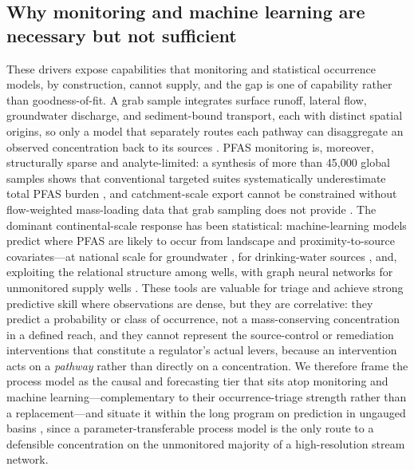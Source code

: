\subsection{Why monitoring and machine learning are necessary but not sufficient}
These drivers expose capabilities that monitoring and statistical occurrence models, by construction, cannot supply, and the gap is one of capability rather than goodness-of-fit. A grab sample integrates surface runoff, lateral flow, groundwater discharge, and sediment-bound transport, each with distinct spatial origins, so only a model that separately routes each pathway can disaggregate an observed concentration back to its sources \citep{rafiei2023}. PFAS monitoring is, moreover, structurally sparse and analyte-limited: a synthesis of more than 45{,}000 global samples shows that conventional targeted suites systematically underestimate total PFAS burden \citep{grunfeld2024}, and catchment-scale export cannot be constrained without flow-weighted mass-loading data that grab sampling does not provide \citep{byrne2024}. The dominant continental-scale response has been statistical: machine-learning models predict where PFAS are likely to occur from landscape and proximity-to-source covariates---at national scale for groundwater \citep{tokranov2024}, for drinking-water sources \citep{fernandez2023}, and, exploiting the relational structure among wells, with graph neural networks for unmonitored supply wells \citep{rafiei2026gnn}. These tools are valuable for triage and achieve strong predictive skill where observations are dense, but they are correlative: they predict a probability or class of occurrence, not a mass-conserving concentration in a defined reach, and they cannot represent the source-control or remediation interventions that constitute a regulator's actual levers, because an intervention acts on a \emph{pathway} rather than directly on a concentration. We therefore frame the process model as the causal and forecasting tier that sits atop monitoring and machine learning---complementary to their occurrence-triage strength rather than a replacement---and situate it within the long program on prediction in ungauged basins \citep{hrachowitz2013}, since a parameter-transferable process model is the only route to a defensible concentration on the unmonitored majority of a high-resolution stream network.

